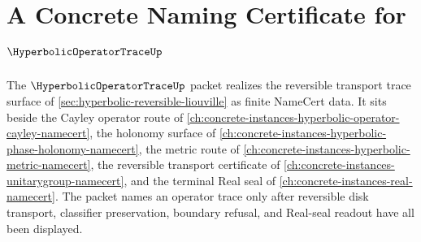 \chapter{A Concrete Naming Certificate for $\HyperbolicOperatorTraceUp$}
\label{ch:concrete-instances-hyperbolic-operator-trace-namecert}

The $\HyperbolicOperatorTraceUp$ packet realizes the reversible transport trace surface of \autoref{sec:hyperbolic-reversible-liouville} as finite NameCert data. It sits beside the Cayley operator route of \autoref{ch:concrete-instances-hyperbolic-operator-cayley-namecert}, the holonomy surface of \autoref{ch:concrete-instances-hyperbolic-phase-holonomy-namecert}, the metric route of \autoref{ch:concrete-instances-hyperbolic-metric-namecert}, the reversible transport certificate of \autoref{ch:concrete-instances-unitarygroup-namecert}, and the terminal Real seal of \autoref{ch:concrete-instances-real-namecert}. The packet names an operator trace only after reversible disk transport, classifier preservation, boundary refusal, and Real-seal readout have all been displayed.

